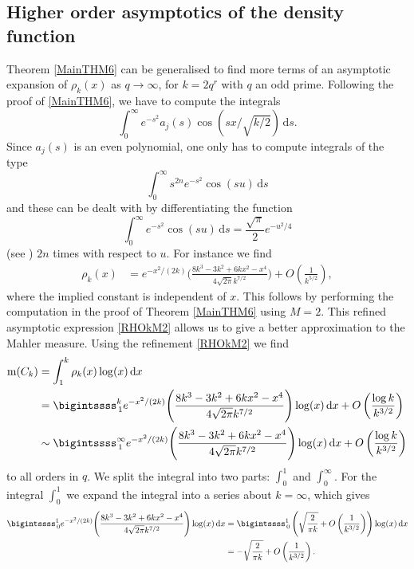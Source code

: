 \documentclass[12pt,reqno]{amsart}
\theoremstyle{definition}
\theoremstyle{plain}
\theoremstyle{definition}
\newcommand\m{\mathrm{m}}
\renewcommand{\d}{\mathrm{d}}
\begin{document}
\subsection{Higher order asymptotics of the density function} 
Theorem \ref{MainTHM6} can be generalised to find more terms of an asymptotic expansion of $\rho_k(x)$ as $q \to \infty$, 
 for $k=2q^r$ with $q$ an odd prime. Following the proof of 
\ref{MainTHM6}, we have to compute the integrals
\[
\int_0^{\infty} e^{-s^2} a_j(s) \cos(s x/\sqrt{k/2}) \, \d s.
\]
Since $a_j(s)$ is an even polynomial, one only has to compute integrals of the type
\[
\int_0^\infty s^{2 n} e^{-s^2} \cos(s u) \, \d s
\]
and these can be dealt with by differentiating the function 
\[
\int_0^\infty e^{-s^2} \cos(s u) \, \d s = \frac{\sqrt{\pi}}{2}e^{-u^2/4}
\]
(see \cite[p. 488]{GR})
$2n$ times with respect to $u$.
For instance we find
\begin{align}
	\label{RHOkM2}
	\rho_k(x) &= e^{-x^2/(2k)} \Bigg (\frac{8 k^3-3 k^2+6 k x^2-x^4}{4 \sqrt{2 \pi } k^{7/2}}\Bigg)+ O\left(\frac{1}{k^{5/2}}\right),
\end{align}
where the implied constant is independent of $x$. This follows by performing the computation in the proof of Theorem \ref{MainTHM6} using $M = 2$.
This refined asymptotic expression \eqref{RHOkM2} allows us to give a better approximation to the Mahler measure. Using the refinement \eqref{RHOkM2} we find
\begin{align*}
	\m(C_k) &= \int_1^{k} \rho_k(x) \log(x) \, \d x  \\
	&=\bigintssss_{\, 1}^k e^{-x^2/(2k)} \Bigg (\frac{8 k^3-3 k^2+6 k x^2-x^4}{4 \sqrt{2 \pi } k^{7/2}}\Bigg) \log(x) \, \d x + O\left(\frac{\log k}{k^{3/2}}\right)\\
	&\sim \bigintssss_{\, 1}^\infty e^{-x^2/(2k)} \Bigg (\frac{8 k^3-3 k^2+6 k x^2-x^4}{4 \sqrt{2 \pi } k^{7/2}}\Bigg) \log(x) \, \d x + O\left(\frac{\log k}{k^{3/2}}\right)
\end{align*}
to all orders in $q$.
We split the integral into two parts: $\int_0^1$ and $\int_0^\infty$. For the integral $\int_0^1$ we expand the integral into a series about $k = \infty$, which gives
\begin{align*} 
\bigintssss_{\, 0}^1 e^{-x^2/(2k)} \Bigg (\frac{8 k^3-3 k^2+6 k x^2-x^4}{4 \sqrt{2 \pi } k^{7/2}}\Bigg) \log(x) \, \d x & = \bigintssss_{\, 0}^1  \left( \sqrt{\frac{2}{\pi k }} + O\left(\frac{1}{k^{3/2}} \right)\right) \log(x) \, \d x \\ &= -  \sqrt{\frac{2}{\pi k }} +O\left(\frac{1}{k^{3/2}} \right).
\end{align*} 
\end{document}
